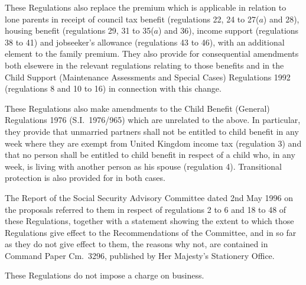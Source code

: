 \documentclass[12pt,a4paper]{article}
\begin{document}
  These Regulations also replace the premium which is applicable in relation to lone parents in receipt of council tax benefit (regulations 22, 24 to 27($a$) and 28), housing benefit (regulations 29, 31 to 35($a$) and 36), income support (regulations 38 to 41) and jobseeker’s allowance (regulations 43 to 46), with an additional element to the family premium. They also provide for consequential amendments both elsewere in the relevant regulations relating to those benefits and in the Child Support (Maintenance Assessments and Special Cases) Regulations 1992 (regulations 8 and 10 to 16) in connection with this change.

  These Regulations also make amendments to the Child Benefit (General) Regulations 1976 (S.I.\ 1976/965) which are unrelated to the above. In particular, they provide that unmarried partners shall not be entitled to child benefit in any week where they are exempt from United Kingdom income tax (regulation 3) and that no person shall be entitled to child benefit in respect of a child who, in any week, is living with another person as his spouse (regulation 4). Transitional protection is also provided for in both cases.

  The Report of the Social Security Advisory Committee dated 2nd May 1996 on the proposals referred to them in respect of regulations 2 to 6 and 18 to 48 of these Regulations, together with a statement showing the extent to which those Regulations give effect to the Recommendations of the Committee, and in so far as they do not give effect to them, the reasons why not, are contained in Command Paper Cm.\ 3296, published by Her Majesty’s Stationery Office.

  These Regulations do not impose a charge on business.
\end{document}
